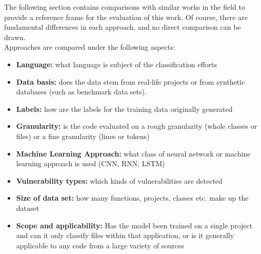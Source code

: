 \documentclass[
a4paper,
pagesize,
pdftex,
12pt,
twoside, %
BCOR=5mm, %
ngerman,
fleqn,
final,
]{scrartcl}
\begin{document}
	The following section contains comparisons with similar works in the field to provide a reference frame for the evaluation of this work. Of course, there are fundamental differences in each approach, and no direct comparison can be drawn.\\
	Approaches are compared under the following aspects:\\
	\begin{itemize}
		\item \textbf{Language:} what language is subject of the classification efforts
		\item \textbf{Data basis:} does the data stem from real-life projects or from synthetic databases (such as benchmark data sets).
		\item \textbf{Labels:} how are the labels for the training data originally generated
		\item \textbf{Granularity:} is the code evaluated on a rough granularity (whole classes or files) or a fine granularity (lines or tokens)
		\item \textbf{Machine Learning Approach:} what class of neural network or machine learning approach is used (CNN, RNN, LSTM)
		\item \textbf{Vulnerability types:} which kinds of vulnerabilities are detected
		\item \textbf{Size of data set:} how many functions, projects, classes etc. make up the dataset
		\item \textbf{Scope and applicability:} Has the model been trained on a single project and can it only classify files within that application, or is it generally applicable to any code from a large variety of sources
	\end{itemize}
	
\end{document}
